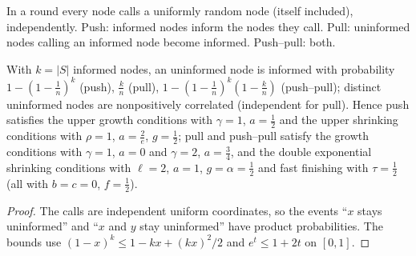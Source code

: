 \begin{definition}\label{def:rumor-protocols}
\leanok{}
In a round every node calls a uniformly random node (itself included), independently. Push:
informed nodes inform the nodes they call. Pull: uninformed nodes calling an informed node become
informed. Push--pull: both.
\end{definition}

\begin{lemma}\label{lem:rumor-protocol-conditions}
\leanok{}
With $k=|S|$ informed nodes, an uninformed node is informed with probability
$1-(1-\frac1n)^k$ (push), $\frac kn$ (pull), $1-(1-\frac1n)^k(1-\frac kn)$ (push--pull);
distinct uninformed nodes are nonpositively correlated (independent for pull). Hence push
satisfies the upper growth conditions with $\gamma=1$, $a=\frac12$ and the upper shrinking
conditions with $\rho=1$, $a=\frac2e$, $g=\frac12$; pull and push--pull satisfy the growth
conditions with $\gamma=1$, $a=0$ and $\gamma=2$, $a=\frac34$, and the double exponential
shrinking conditions with $\ell=2$, $a=1$, $g=\alpha=\frac12$ and fast finishing with
$\tau=\frac12$ (all with $b=c=0$, $f=\frac12$).
\end{lemma}
\begin{proof}\leanok
The calls are independent uniform coordinates, so the events ``$x$ stays uninformed'' and
``$x$ and $y$ stay uninformed'' have product probabilities. The bounds use
$(1-x)^k\le1-kx+(kx)^2/2$ and $e^t\le1+2t$ on $[0,1]$.
\end{proof}

